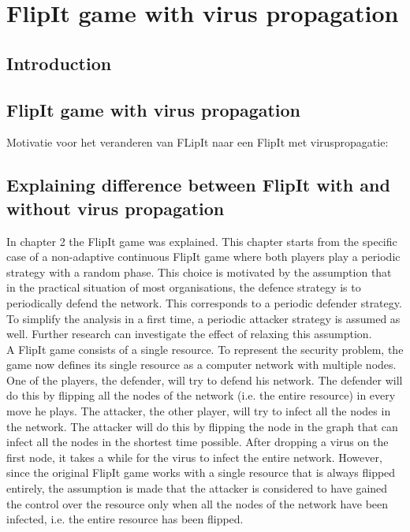 \chapter{FlipIt game with virus propagation}
\label{cha:9}
%


\section{Introduction}

\section{FlipIt game with virus propagation}

Motivatie voor het veranderen van FLipIt naar een FlipIt met viruspropagatie:

\section{Explaining difference between FlipIt with and without virus propagation}

In chapter 2 the FlipIt game was explained.  This chapter starts from the specific case of a non-adaptive continuous FlipIt game where both players play a periodic strategy with a random phase. This choice is motivated by the assumption that in the practical situation of most organisations, the defence strategy is to periodically defend the network. This corresponds to a periodic defender strategy.  To simplify the analysis in a first time, a periodic attacker strategy is assumed as well. Further research can investigate the effect of relaxing this assumption.\\


A FlipIt game consists of a single resource. To represent the security problem, the game now defines its single resource as a computer network with multiple
nodes. One of the players, the defender, will try to defend his network. The defender
will do this by flipping all the nodes of the network (i.e. the entire resource) in every move he plays. The
attacker, the other player, will try to infect all the nodes in the network. The attacker
will do this by flipping the node in the graph that can infect all the nodes in the
shortest time possible. After dropping a virus on the first node, it takes a while for the virus to infect the entire network. However, since the original FlipIt game works with a single resource that is always flipped entirely, the assumption is made that the attacker is considered to have gained the control over the resource only when all the nodes of the network have been infected, i.e. the entire resource has been flipped.

